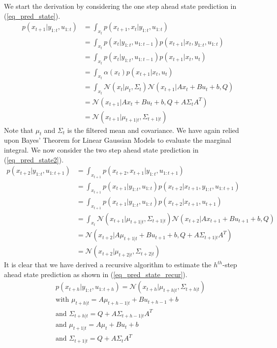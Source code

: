 \documentclass[../masters.tex]{subfiles}
\begin{document}
We start the derivation by considering the one step ahead state prediction in (\ref{eq_pred_state}).
\begin{equation}
\begin{aligned}
p(x_{t+1}|y_{1:t}, u_{1:t}) &= \int_{x_t} p(x_{t+1},x_t|y_{1:t}, u_{1:t}) \\
&= \int_{x_t} p(x_t|y_{1:t}, u_{1:t-1}) p(x_{t+1}|x_t,y_{1:t}, u_{1:t}) \\
&= \int_{x_t} p(x_t|y_{1:t}, u_{1:t-1}) p(x_{t+1}|x_t, u_{t}) \\
&= \int_{x_t} \alpha(x_t) p(x_{t+1}|x_t, u_{t}) \\
&= \int_{x_t} \mathcal{N}(x_t|\mu_t, \Sigma_t) \mathcal{N}(x_{t+1}|Ax_t+Bu_t+b, Q) \\
&= \mathcal{N}(x_{t+1}|Ax_t+Bu_t+b, Q+A\Sigma_t A^T) \\
&= \mathcal{N}(x_{t+1}|\mu_{t+1|t}, \Sigma_{t+1|t})
\end{aligned}
\label{eq_pred_state}
\end{equation}
Note that $\mu_t$ and $\Sigma_t$ is the filtered mean and covariance. We have again relied upon Bayes' Theorem for Linear Gaussian Models to evaluate the marginal integral. We now consider the two step ahead state prediction in (\ref{eq_pred_state2}).
\begin{equation}
\begin{aligned}
p(x_{t+2}|y_{1:t}, u_{1:t+1}) &= \int_{x_{t+1}} p(x_{t+2},x_{t+1}|y_{1:t}, u_{1:t+1}) \\
&= \int_{x_{t+1}} p(x_{t+1}|y_{1:t}, u_{1:t}) p(x_{t+2}|x_{t+1},y_{1:t}, u_{1:t+1}) \\
&= \int_{x_{t+1}} p(x_{t+1}|y_{1:t}, u_{1:t}) p(x_{t+2}|x_{t+1}, u_{t+1}) \\
&= \int_{x_t} \mathcal{N}(x_{t+1}|\mu_{t+1|t}, \Sigma_{t+1|t})\mathcal{N}(x_{t+2}|Ax_{t+1}+Bu_{t+1}+b, Q) \\
&= \mathcal{N}(x_{t+2}|A\mu_{t+1|t}+Bu_{t+1}+b, Q+A\Sigma_{t+1|t} A^T) \\
&= \mathcal{N}(x_{t+2}|\mu_{t+2|t}, \Sigma_{t+2|t})
\end{aligned}
\label{eq_pred_state2}
\end{equation}
It is clear that we have derived a recursive algorithm to estimate the $h^{th}$-step ahead state prediction as shown in (\ref{eq_pred_state_recur}).
\begin{equation}
\begin{aligned}
&p(x_{t+h}|y_{1:t}, u_{1:t+h}) = \mathcal{N}(x_{t+h}|\mu_{t+h|t}, \Sigma_{t+h|t}) \\
&\text{with } \mu_{t+h|t} = A\mu_{t+h-1|t}+Bu_{t+h-1} +b \\
&\text{and } \Sigma_{t+h|t} = Q+A\Sigma_{t+h-1|t} A^T \\
&\text{and } \mu_{t+1|t} = A\mu_t+Bu_{t}+b \\
&\text{and } \Sigma_{t+1|t} = Q+A\Sigma_t A^T \\ 
\end{aligned}
\label{eq_pred_state_recur}
\end{equation}
\end{document}

